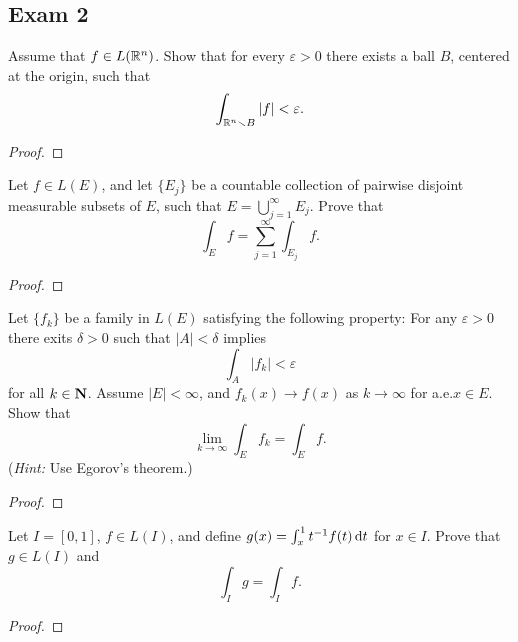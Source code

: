 \subsection{Exam 2}
\begin{problem}
Assume that $f\in L(\mathbb{R}^n)$. Show that for every $\varepsilon>0$ there
exists a ball $B$, centered at the origin, such that
\[
\int_{\mathbb{R}^n\smallsetminus B}|f|<\varepsilon.
\]
\end{problem}
\begin{proof}
\end{proof}

\begin{problem}
Let $f\in L(E)$, and let $\{E_j\}$ be a countable collection of pairwise
disjoint measurable subsets of $E$, such that $E=\bigcup_{j=1}^\infty
E_j$. Prove that
\[
\int_E f=\sum_{j=1}^\infty\int_{E_j}f.
\]
\end{problem}
\begin{proof}
\end{proof}

\begin{problem}
Let $\{f_k\}$ be a family in $L(E)$ satisfying the following property:
For any $\varepsilon>0$ there exits $\delta>0$ such that $|A|<\delta$
implies
\[
\int_A |f_k|<\varepsilon
\]
for all $k\in\mathbf{N}$. Assume $|E|<\infty$, and $f_k(x)\to f(x)$ as
$k\to\infty$ for a.e.\@ $x\in E$. Show that
\[
\lim_{k\to\infty}\int_E f_k=\int_E f.
\]
(\emph{Hint:} Use Egorov's theorem.)
\end{problem}
\begin{proof}
\end{proof}

\begin{problem}
Let $I=[0,1]$, $f\in L(I)$, and define $g(x)=\int_x^1
t^{-1}f(t) \mathop{}\!\mathrm{d} t$ for $x\in I$. Prove that $g\in L(I)$ and
\[
\int_I g=\int_I f.
\]
\end{problem}
\begin{proof}
\end{proof}

